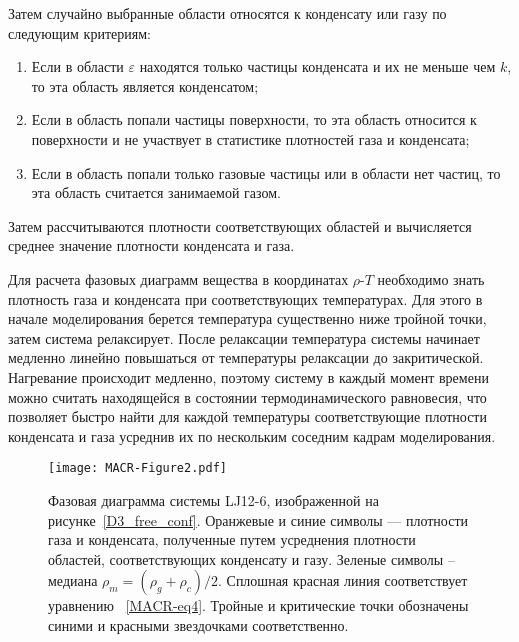 Затем случайно выбранные области относятся к конденсату или газу по следующим критериям:
\begin{enumerate}
\item Если в области $\varepsilon$ находятся только частицы конденсата и их не меньше чем $k$, то эта область является конденсатом;
\item Если в область попали частицы поверхности, то эта область относится к поверхности и не участвует в статистике плотностей газа и конденсата;
\item Если в область попали только газовые частицы или в области нет частиц, то эта область считается занимаемой газом.
\end{enumerate}
Затем рассчитываются плотности соответствующих областей и вычисляется среднее значение плотности конденсата и газа.

Для расчета фазовых диаграмм вещества в координатах $\rho$-$T$ необходимо знать плотность газа и конденсата при соответствующих температурах.
Для этого в начале моделирования берется температура существенно ниже тройной точки, затем система релаксирует.
После релаксации температура системы начинает медленно линейно повышаться от температуры релаксации до закритической.
Нагревание происходит медленно, поэтому систему в каждый момент времени можно считать находящейся в состоянии термодинамического равновесия, что позволяет быстро найти для каждой температуры соответствующие плотности конденсата и газа усреднив их по нескольким соседним кадрам моделирования.

\begin{figure}[!t]
  \centering
  \texttt{[image: MACR-Figure2.pdf]}
  \caption{Фазовая диаграмма системы LJ12-6, изображенной на рисунке~\ref{D3_free_conf}.
    Оранжевые и синие символы — плотности газа и конденсата, полученные путем усреднения плотности областей, соответствующих конденсату и газу.
    Зеленые символы -- медиана $\rho_m=(\rho_g+\rho_c)/2$.
    Сплошная красная линия соответствует уравнению ~\eqref{MACR-eq4}.
    Тройные и критические точки обозначены синими и красными звездочками соответственно.}
  \label{phase_diagram}
\end{figure}



